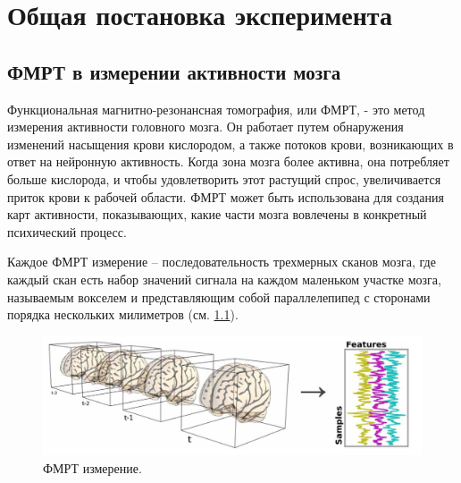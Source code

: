 \documentclass[pdftex,ptm,12pt,a4paper]{report}
\theoremstyle{definition}
\begin{document}
\tableofcontents

\sloppy


\chapter{Общая постановка эксперимента}
\section{ФМРТ в измерении активности мозга}

Функциональная магнитно-резонансная томография, или ФМРТ, - это метод измерения активности головного мозга. Он работает путем обнаружения изменений насыщения крови кислородом, а также потоков крови, возникающих в ответ на нейронную активность. Когда зона мозга более активна, она потребляет больше кислорода, и чтобы удовлетворить этот растущий спрос, увеличивается приток крови к рабочей области. ФМРТ может быть использована для создания карт активности, показывающих, какие части мозга вовлечены в конкретный психический процесс.

Каждое ФМРТ измерение -- последовательность трехмерных сканов мозга, где каждый скан есть набор значений сигнала на каждом маленьком участке мозга, называемым вокселем и представляющим собой параллелепипед с сторонами порядка нескольких милиметров (см. \ref{fmri_result}).

\begin{figure}[h]
\includegraphics[scale=0.2]{images/fmrt_result.png}
\centering
\caption{ФМРТ измерение.}
\label{fmri_result}
\end{figure}
\end{document}
